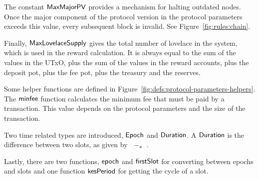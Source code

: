 The constant $\mathsf{MaxMajorPV}$ provides a mechanism for halting outdated nodes.
Once the major component of the protocol version in the protocol parameters
exceeds this value, every subsequent block is invalid.
See Figure~\ref{fig:rules:chain}.

Finally, $\mathsf{MaxLovelaceSupply}$ gives the total number of lovelace in the system,
which is used in the reward calculation.
It is always equal to the sum of the values in the UTxO, plus the sum of the
values in the reward accounts, plus the deposit pot, plus the fee pot,
plus the treasury and the reserves.


Some helper functions are defined in Figure~\ref{fig:defs:protocol-parameters-helpers}.
The $\mathsf{minfee}$ function calculates the minimum fee that must be paid by a transaction.
This value depends on the protocol parameters and the size of the transaction.

Two time related types are introduced, $\mathsf{Epoch}$ and $\mathsf{Duration}$.
A $\mathsf{Duration}$ is the difference between two slots, as given by $\mathit{}~-_{s}~\mathit{}$.

Lastly, there are two functions, $\mathsf{epoch}$ and $\mathsf{firstSlot}$ for converting
between epochs and slots and one function $\mathsf{kesPeriod}$ for getting the cycle of a slot.

